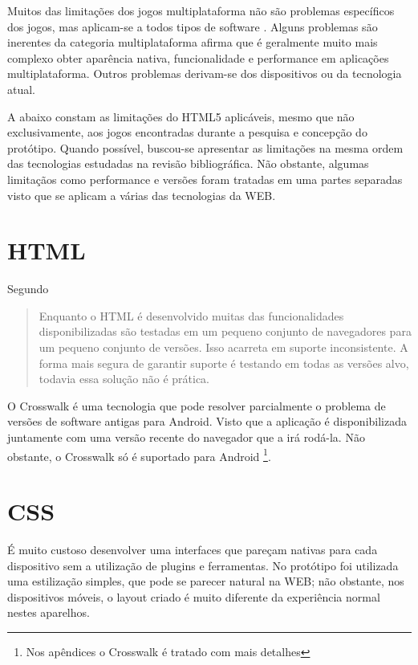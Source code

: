
Muitos das limitações dos jogos multiplataforma não são
problemas específicos dos jogos, mas aplicam-se a todos tipos
de software \autocite[pp. 3]{currentStateCrossPlatform}. Alguns
problemas são inerentes da categoria multiplataforma \cite[pp.
7 ]{viabilityBusinessApplications} afirma que é geralmente muito
mais complexo obter aparência nativa, funcionalidade e performance
em aplicações multiplataforma. Outros problemas derivam-se dos
dispositivos ou da tecnologia atual.

A abaixo constam as limitações do HTML5 aplicáveis, mesmo que não
exclusivamente, aos jogos encontradas durante a pesquisa e concepção
do protótipo. Quando possível, buscou-se apresentar as limitações
na mesma ordem das tecnologias estudadas na revisão bibliográfica.
Não obstante, algumas limitaçãos como performance e versões foram
tratadas em uma partes separadas visto que se aplicam a várias das
tecnologias da WEB.

\section{HTML}

Segundo \cite{crossPlatformMobileGame}
\begin{quote}
Enquanto o HTML é desenvolvido muitas das funcionalidades
disponibilizadas são testadas em um pequeno conjunto de navegadores
para um pequeno conjunto de versões. Isso acarreta em suporte
inconsistente. A forma mais segura de garantir suporte é testando em
todas as versões alvo, todavia essa solução não é prática.
\end{quote}

O Crosswalk é uma tecnologia que pode resolver parcialmente o problema
de versões de software antigas para Android. Visto que a aplicação
é disponibilizada juntamente com uma versão recente do navegador que
a irá rodá-la. Não obstante, o Crosswalk só é suportado
para Android \footnote{Nos apêndices o Crosswalk é tratado com mais
detalhes}.


\section{CSS}

É muito custoso desenvolver uma interfaces que pareçam nativas para
cada dispositivo sem a utilização de plugins e ferramentas. No
protótipo foi utilizada uma estilização simples, que pode se parecer
natural na WEB; não obstante, nos dispositivos móveis, o layout criado
é muito diferente da experiência normal nestes aparelhos.

